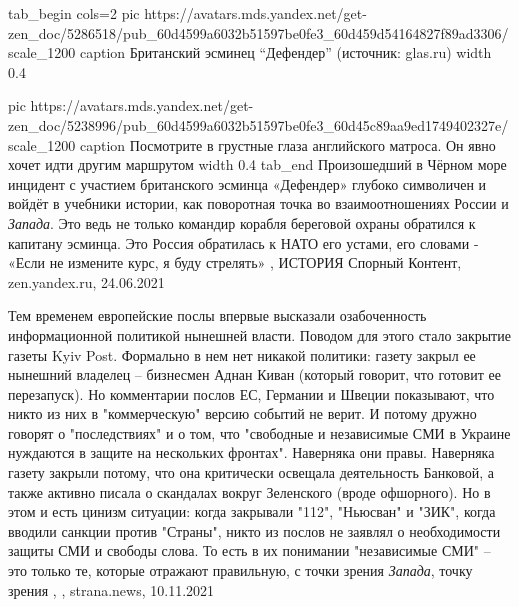 \ifcmt
tab_begin cols=2
  pic https://avatars.mds.yandex.net/get-zen_doc/5286518/pub_60d4599a6032b51597be0fe3_60d459d54164827f89ad3306/scale_1200
	caption Британский эсминец \enquote{Дефендер} (источник: glas.ru)
	width 0.4

	pic https://avatars.mds.yandex.net/get-zen_doc/5238996/pub_60d4599a6032b51597be0fe3_60d45c89aa9ed1749402327e/scale_1200
	caption Посмотрите в грустные глаза английского матроса. Он явно хочет идти другим маршрутом
	width 0.4
tab_end
\fi
Произошедший в Чёрном море инцидент с участием британского эсминца «Дефендер»
глубоко символичен и войдёт в учебники истории, как поворотная точка во
взаимоотношениях России и \emph{Запада}.  Это ведь не только командир корабля
береговой охраны обратился к капитану эсминца. Это Россия обратилась к НАТО его
устами, его словами - «Если не измените курс, я буду стрелять»
, 
ИСТОРИЯ Спорный Контент, zen.yandex.ru, 24.06.2021 

Тем временем европейские послы впервые высказали озабоченность информационной
политикой нынешней власти. Поводом для этого стало закрытие газеты Kyiv Post.
Формально в нем нет никакой политики: газету закрыл ее нынешний владелец –
бизнесмен Аднан Киван (который говорит, что готовит ее перезапуск).  Но
комментарии послов ЕС, Германии и Швеции показывают, что никто из них в
"коммерческую" версию событий не верит. И потому дружно говорят о
"последствиях" и о том, что "свободные и независимые СМИ в Украине нуждаются в
защите на нескольких фронтах".  Наверняка они правы. Наверняка газету закрыли
потому, что она критически освещала деятельность Банковой, а также активно
писала о скандалах вокруг Зеленского (вроде офшорного).  Но в этом и есть
цинизм ситуации: когда закрывали "112", "Ньюсван" и "ЗИК", когда вводили
санкции против "Страны", никто из послов не заявлял о необходимости защиты СМИ
и свободы слова. То есть в их понимании "независимые СМИ" – это только те,
которые отражают правильную, с точки зрения \emph{Запада}, точку зрения
, 
, strana.news, 10.11.2021
